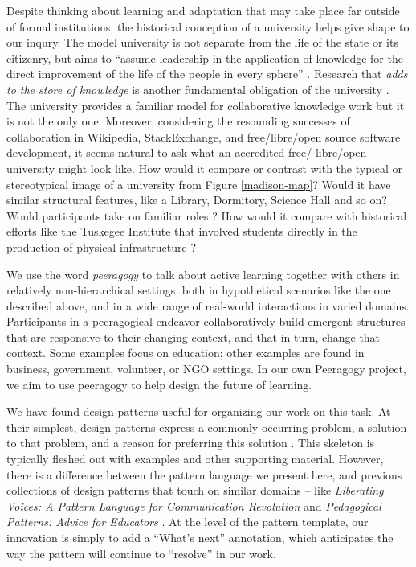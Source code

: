 Despite thinking about learning and adaptation that
may take place far outside of formal institutions, the historical
conception of a university helps give shape to our inqury.
%
The model university is not separate from the life of the state or its
citizenry, but aims to ``assume leadership in the application of
knowledge for the direct improvement of the life of the people in
every sphere'' \cite[p.~88]{curti1949university}. Research that
\emph{adds to the store of knowledge} is another fundamental
obligation of the university \cite[p.~550]{curti1949university}.
The university provides a familiar model for collaborative knowledge work
but it is not the only one.
Moreover, considering the resounding successes of collaboration in Wikipedia,
StackExchange, and free\slash libre\slash open source software
development, it seems natural to ask what an accredited free\slash
libre\slash open university might look like.  How would it compare or
contrast with the typical or stereotypical image of a university from
Figure \ref{madison-map}?  Would it have similar structural features, like a Library,
Dormitory, Science Hall and so on?  Would participants take
on familiar roles \cite{corneli+crowdsourcing}?  How would it compare
with historical efforts like the Tuskegee Institute that involved
students directly in the production of physical infrastructure
\cite{washington1986up,building-peeragogy-accelerator}?

We use the word \emph{peeragogy} to talk about active learning
together with others in relatively non-hierarchical settings, both in
hypothetical scenarios like the one described above, and in a wide
range of real-world interactions in varied domains.  Participants in a
peeragogical endeavor collaboratively build emergent structures that
are responsive to their changing context, and that in turn, change that
context.  Some examples focus on education; other examples are found
in business, government, volunteer, or NGO settings.  In our own
Peeragogy project, we aim to use peeragogy to help design the future of
learning.

We have found design patterns useful for organizing our work on this task.  
At their simplest, design patterns express a commonly-occurring problem,
a solution to that problem, and a reason for preferring this solution \cite{meszaros1998pattern}.
This skeleton is typically fleshed out with examples and other supporting material.
However, there is a difference between the pattern language we present here, and previous collections of design patterns that touch on similar domains -- like \emph{Liberating Voices: A Pattern Language for Communication Revolution} \cite{schuler2008liberating} and \emph{Pedagogical Patterns: Advice for Educators} \cite{bergin2012pedagogical}.  At the level of the pattern template, our innovation is simply to add a ``What's next'' annotation, which anticipates the way the pattern will continue to ``resolve'' in our work.

